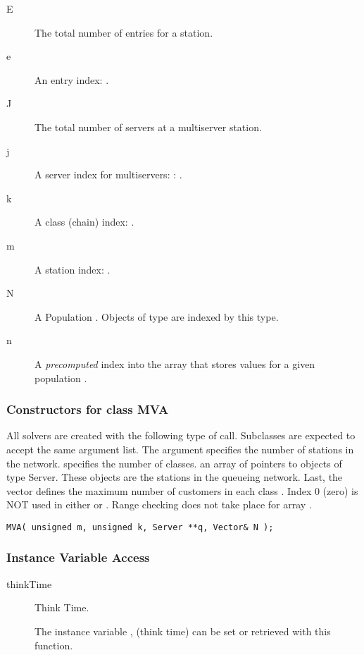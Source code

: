 \label{sec:mva-conventions}
\begin{description}
\item[E] \texonly{---} The total number of entries for a station.
\item[e] \texonly{---} An entry index: .
\item[J] \texonly{---} The total number of servers at a multiserver
  station.
\item[j]  \texonly{---} A server index for multiservers: : .
\item[k] \texonly{---} A class (chain) index: .
\item[m] \texonly{---} A station index: .
\item[N] \texonly{---} A Population .
  Objects of type  are indexed
  by this type.
\item[n] \texonly{---} A \emph{precomputed} index into the array that
  stores values for a given population .
\end{description}


\subsubsection{Constructors for class MVA}

All solvers are created with the following type of call.  Subclasses
are expected to accept the same argument list.  The argument 
specifies the number of stations in the network.   specifies
the number of classes.   an array of pointers to objects of
type Server.  These objects are the stations in the queueing network.
Last, the vector  defines the maximum number of customers in
each class .  Index 0 (zero) is NOT used in either  or
.  Range checking does not take place for array .

\begin{verbatim}
MVA( unsigned m, unsigned k, Server **q, Vector& N );
\end{verbatim}

\subsubsection{Instance Variable Access}

\begin{description}
\item[thinkTime] \texonly{---} Think Time.\\

  The instance variable , (think time) can be set or retrieved
  with this function.
\end{description}

